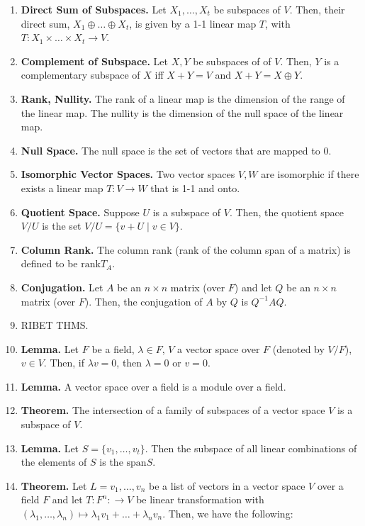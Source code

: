 \begin{enumerate}
      \item \textbf{Direct Sum of Subspaces. } Let $X_1,\dots,X_t$ be subspaces of $V$. Then, their direct sum, $X_1 \oplus \dots \oplus X_t$, is given by a 1-1 linear map $T$, with $T: X_1\times \dots \times X_t \to V$.
	\item \textbf{Complement of Subspace. } Let $X,Y$ be subspaces of of $V$. Then, $Y$ is a complementary subspace of $X$ iff $X+Y=V$ and $X+Y = X \oplus Y$. 
	\item \textbf{Rank, Nullity. } The rank of a linear map is the dimension of the range of the linear map. The nullity is the dimension of the null space of the linear map. 
	\item \textbf{Null Space. } The null space is the set of vectors that are mapped to $0$. 
	\item \textbf{Isomorphic Vector Spaces. } Two vector spaces $V, W$ are isomorphic if there exists a linear map $T: V \to W$ that is 1-1 and onto. 
	\item \textbf{Quotient Space. } Suppose $U$ is a subspace of $V$. Then, the quotient space $V / U$ is the set $V / U = \{v + U \mid v \in V\}$. 
	\item \textbf{Column Rank. } The column rank (rank of the column span of a matrix) is defined to be $\textrm{rank}T_A$. 
	\item \textbf{Conjugation. } Let $A$ be an $n \times n$ matrix (over $F$) and let $Q$ be an $n \times n$ matrix (over $F$). Then, the conjugation of $A$ by $Q$ is $Q^{-1}AQ$.
	\item RIBET THMS. 
	\item \textbf{Lemma. } Let $F$ be a field, $\lambda \in F$, $V$ a vector space over $F$ (denoted by $V/F$), $v \in V$. Then, if $\lambda v = 0$, then $\lambda=0$ or $v=0$. 
    \item \textbf{Lemma. } A vector space over a field is a module over a field. 
    \item \textbf{Theorem. } The intersection of a family of subspaces of a vector space $V$ is a subspace of $V$. 
    \item \textbf{Lemma. } Let $S=\{v_1,\dots,v_t\}$. Then the subspace of all linear combinations of the elements of $S$ is the $\mathrm{span}S$. 
    \item \textbf{Theorem. } Let $L=v_1,\dots,v_n$ be a list of vectors in a vector space $V$ over a field $F$ and let $T: F^n: \to V$ be linear transformation with $(\lambda_1,\dots,\lambda_n) \mapsto \lambda_1v_1 + \dots + \lambda_nv_n$. Then, we have the following: 

\end{enumerate}
